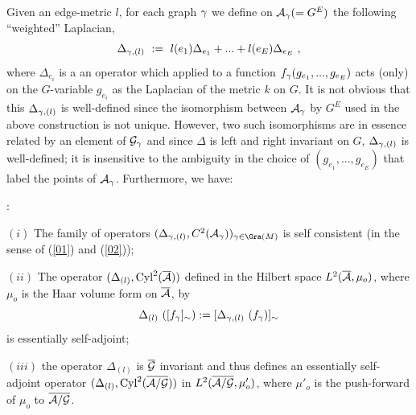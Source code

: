 Given an edge-metric $l$, for each  graph $\gamma$ we define on 
${\cal A}_\gamma(=G^E)$ the following ``weighted'' Laplacian,
\begin{equation}
\Delta_{\g,(l)}\ :=\ l(e_1)\Delta_{e_1}+...+ l(e_E)\Delta_{e_E}\ ,
\end{equation}
where $\Delta_{e_i}$ is a an operator which applied to a function
$f_\gamma(g_{e_1},...,g_{e_E})$ acts (only) on the $G$-variable $g_{e_i}$
as the Laplacian of the metric $k$ on $G$. It is not obvious that 
this $\Delta_{\gamma,(l)}$ is well-defined since the isomorphism between
${\cal A}_\gamma$ by $G^E$ used in the above construction is not unique.
However, two such isomorphisms are in essence related by an element of
${\cal G}_\gamma$ and since $\Delta$ is left and right invariant on $G$,
$\Delta_{\gamma,(l)}$ is well-defined; it is insensitive to the ambiguity
in the choice of $(g_{e_1},...,g_{e_E})$ that label the points of
${\cal A}_\gamma$. Furthermore, we have:

\begin{theorem}{\rm :} \label{delta} 

\noindent $(i)$ The family of operators $(\Delta_{\g,(l)},  
C^2(\A_\g))_{\g\in \Gra(\S)}$ is self consistent (in the sense of 
(\ref{01}) and  (\ref{02}));

\noindent $(ii)$
The operator $(\Delta_{(l)},{\rm Cyl}^2(\overline{{\cal A}}))$ defined in the 
Hilbert space $L^2({\overline {{\cal A}}}, \mu_o)$, where $\mu_o$ is the Haar volume 
form on ${\overline {{\cal A}}}$, by
\begin{equation}
\Delta_{(l)}\ ([f_\g]_\sim):=[\Delta_{\g,(l)}\ (f_\g)]_\sim 
\end{equation}
is essentially self-adjoint; 

\noindent $(iii)$
the operator $\Delta_{(l)}$ is ${\overline {{\cal G}}}$ invariant and thus defines an 
essentially self-adjoint operator $(\Delta_{(l)},{\rm Cyl}^2(\overline{{\cal A}/{\cal G}}))$ in 
$L^2(\overline{{\cal A}/{\cal G}},\mu'_o)$, where $\mu'_o$ is the push-forward of $\mu_o$ to
$\overline{{\cal A}/{\cal G}}$. 
\end{theorem}

